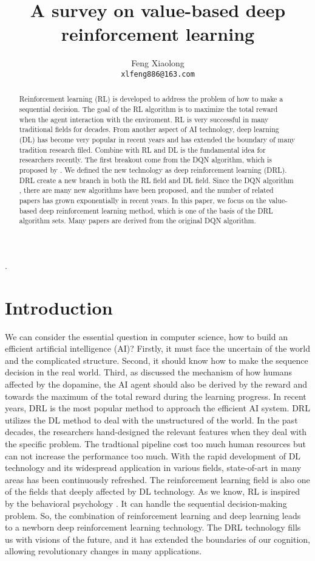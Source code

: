 \documentclass{article}
\title{A survey on value-based deep reinforcement learning}
\author{Feng Xiaolong  \\
	\texttt{xlfeng886@163.com} \\
}
\begin{document}
\maketitle



.
\begin{abstract}
Reinforcement learning (RL) is developed to address the problem of how to make a sequential decision. The goal of the RL algorithm is to maximize the total reward when the agent interaction with the enviroment. RL is very successful in many traditional fields for decades. From another aspect of AI technology,  deep learning (DL) has become very popular in recent years and  has extended the boundary of many tradition research filed. Combine with RL and DL is the fundamental idea for researchers recently. The first breakout come from the DQN algorithm, which is proposed by \citep{mnih2013playing}. We defined the new technology as deep reinforcement learning (DRL). DRL create a new branch in both the RL field and DL field. Since the DQN algorithm \citep{mnih2013playing}, there are many new algorithms have been proposed, and the number of related papers has grown exponentially in recent years. In this paper, we focus on the value-based deep reinforcement learning method, which is one of the basis of the DRL algorithm sets. Many papers are derived from the original DQN algorithm.
\end{abstract}
%
\section{Introduction}
\label{sec:Introduction}
We can consider the essential question in computer science, how to build an efficient artificial intelligence (AI)? Firstly, it must face the uncertain of the world and the complicated structure. Second, it should know how to make the sequence decision in the real world. Third, as \citep{sutton2018reinforcement} discussed the mechanism of how humans affected by the dopamine, the AI agent should also be derived by the reward and towards the maximum of the total reward during the learning progress. In recent years, DRL is the most popular method to approach the efficient AI system. DRL utilizes the DL method to deal with the unstructured of the world. 
In the past decades, the researchers hand-designed the relevant features when they deal with the specific problem. The  tradtional pipeline cost too much human resources but can not increase the performance too much. With the rapid development of DL technology and its widespread application in various fields, state-of-art in many areas has been continuously refreshed. The reinforcement learning field is also one of the fields that deeply affected by DL technology. As we know, RL is inspired by the behavioral psychology   \citep{sutton2018reinforcement}. It can handle the sequential decision-making problem. So, the combination of reinforcement learning and deep learning leads to a newborn deep reinforcement learning technology. The DRL technology fills us with visions of the future, and it has extended the boundaries of our cognition, allowing revolutionary changes in many applications.
\end{document}
